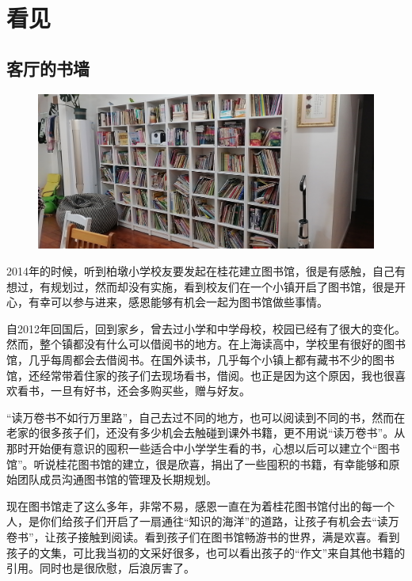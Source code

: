 \section{看见}

\vspace{10pt}

{\centering\subsection*{客厅的书墙}}


\renewcommand{\leftmark}{客厅的书墙}

\begin{figure}[htbp]

\centering

\includegraphics[width = .5\textwidth]{./ch/zzg.jpg}

\end{figure}



2014年的时候，听到柏墩小学校友要发起在桂花建立图书馆，很是有感触，自己有想过，有规划过，然而却没有实施，看到校友们在一个小镇开启了图书馆，很是开心，有幸可以参与进来，感恩能够有机会一起为图书馆做些事情。


自2012年回国后，回到家乡，曾去过小学和中学母校，校园已经有了很大的变化。然而，整个镇都没有什么可以借阅书的地方。在上海读高中，学校里有很好的图书馆，几乎每周都会去借阅书。在国外读书，几乎每个小镇上都有藏书不少的图书馆，还经常带着住家的孩子们去现场看书，借阅。也正是因为这个原因，我也很喜欢看书，一旦有好书，还会多购买些，赠与好友。


“读万卷书不如行万里路”，自己去过不同的地方，也可以阅读到不同的书，然而在老家的很多孩子们，还没有多少机会去触碰到课外书籍，更不用说“读万卷书”。从那时开始便有意识的囤积一些适合中小学学生看的书，心想以后可以建立个“图书馆”。听说桂花图书馆的建立，很是欣喜，捐出了一些囤积的书籍，有幸能够和原始团队成员沟通图书馆的管理及长期规划。


现在图书馆走了这么多年，非常不易，感恩一直在为着桂花图书馆付出的每一个人，是你们给孩子们开启了一扇通往“知识的海洋”的道路，让孩子有机会去“读万卷书”，让孩子接触到阅读。看到孩子们在图书馆畅游书的世界，满是欢喜。看到孩子的文集，可比我当初的文采好很多，也可以看出孩子的“作文”来自其他书籍的引用。同时也是很欣慰，后浪厉害了。


